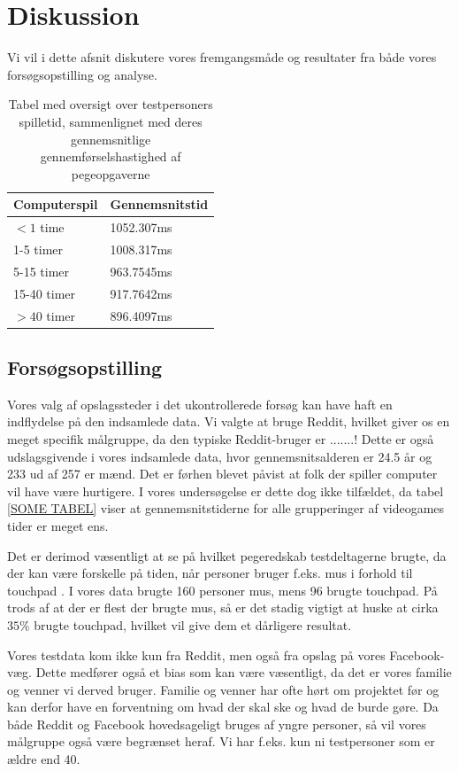 \chapter*{Diskussion}
Vi vil i dette afsnit diskutere vores fremgangsmåde og resultater fra både vores forsøgsopstilling og analyse.

\begin{table}[h]
	\centering
	\begin{tabular}{ll}
		Computerspil & Gennemsnitstid\\\hline
		$<1$ time    & 1052.307ms\\
		1-5 timer    & 1008.317ms\\
		5-15 timer   & 963.7545ms\\
		15-40 timer  & 917.7642ms\\
		$>40$ timer  & 896.4097ms\\
	\end{tabular}
	\caption{Tabel med oversigt over testpersoners spilletid, sammenlignet med deres gennemsnitlige gennemførselshastighed af pegeopgaverne}
	\label{tab:times_average}
\end{table}

\section*{Forsøgsopstilling}
Vores valg af opslagssteder i det ukontrollerede forsøg kan have haft en indflydelse på den indsamlede data. Vi valgte at bruge Reddit, hvilket giver os en meget specifik målgruppe, da den typiske Reddit-bruger er .......! Dette er også udslagsgivende i vores indsamlede data, hvor gennemsnitsalderen er 24.5 år og 233 ud af 257 er mænd. Det er førhen blevet påvist at folk der spiller computer vil have være hurtigere\cite{wyeld2013}. I vores undersøgelse er dette dog ikke tilfældet, da tabel \ref{SOME TABEL} viser at gennemsnitstiderne for alle grupperinger af videogames tider er meget ens.

Det er derimod væsentligt at se på hvilket pegeredskab testdeltagerne brugte, da der kan være forskelle på tiden, når personer bruger f.eks. mus i forhold til touchpad \cite{epps1986}. I vores data brugte 160 personer mus, mens 96 brugte touchpad. På trods af at der er flest der brugte mus, så er det stadig vigtigt at huske at cirka $35\%$ brugte touchpad, hvilket vil give dem et dårligere resultat.

Vores testdata kom ikke kun fra Reddit, men også fra opslag på vores Facebook-væg. Dette medfører også et bias som kan være væsentligt, da det er vores familie og venner vi derved bruger. Familie og venner har ofte hørt om projektet før og kan derfor have en forventning om hvad der skal ske og hvad de burde gøre. Da både Reddit og Facebook hovedsageligt bruges af yngre personer, så vil vores målgruppe også være begrænset heraf. Vi har f.eks. kun ni testpersoner som er ældre end 40. 


